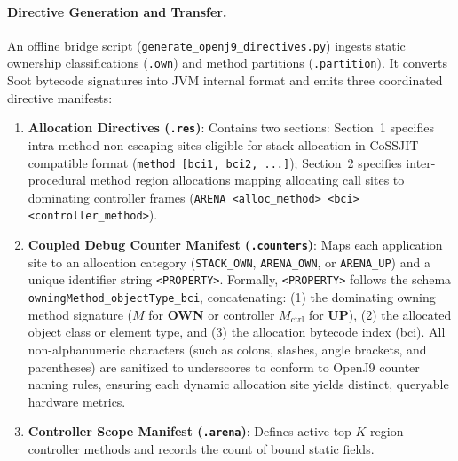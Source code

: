 \documentclass[12pt,a4paper]{article}
\newcommand{\OWN}{\textbf{OWN}}
\newcommand{\UP}{\textbf{UP}}
\begin{document}
\paragraph{Directive Generation and Transfer.}
An offline bridge script (\texttt{generate\_}\allowbreak\texttt{openj9\_}\allowbreak\texttt{directives.py}) ingests static ownership classifications (\texttt{.own}) and method partitions (\texttt{.partition}). It converts Soot bytecode signatures into JVM internal format and emits three coordinated directive manifests:
\begin{enumerate}[leftmargin=*]
  \item \textbf{Allocation Directives (\texttt{.res})}: Contains two sections: Section~1 specifies intra-method non-escaping sites eligible for stack allocation in CoSSJIT-compatible format (\texttt{method [bci1, bci2, ...]}); Section~2 specifies inter-procedural method region allocations mapping allocating call sites to dominating controller frames (\texttt{ARENA <alloc\_method> <bci> <controller\_method>}).
  \item \textbf{Coupled Debug Counter Manifest (\texttt{.counters})}: Maps each application site to an allocation category (\texttt{STACK\_}\allowbreak\texttt{OWN}, \texttt{ARENA\_}\allowbreak\texttt{OWN}, or \texttt{ARENA\_}\allowbreak\texttt{UP}) and a unique identifier string \texttt{<PROPERTY>}. Formally, \texttt{<PROPERTY>} follows the schema \texttt{owningMethod\_}\allowbreak\texttt{objectType\_}\allowbreak\texttt{bci}, concatenating: (1) the dominating owning method signature ($M$ for \OWN{} or controller $M_{\text{ctrl}}$ for \UP{}), (2) the allocated object class or element type, and (3) the allocation bytecode index (bci). All non-alphanumeric characters (such as colons, slashes, angle brackets, and parentheses) are sanitized to underscores to conform to OpenJ9 counter naming rules, ensuring each dynamic allocation site yields distinct, queryable hardware metrics.
  \item \textbf{Controller Scope Manifest (\texttt{.arena})}: Defines active top-$K$ region controller methods and records the count of bound static fields.
\end{enumerate}
\end{document}
